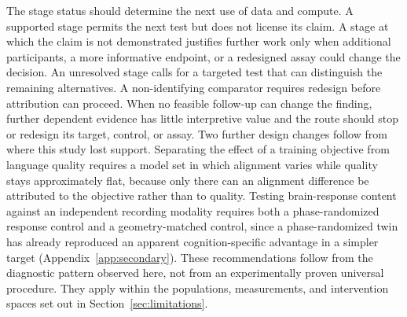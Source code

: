The stage status should determine the next use of data and compute.
A supported stage permits the next test but does not license its claim.
A stage at which the claim is not demonstrated justifies further work only when additional participants, a more informative endpoint, or a redesigned assay could change the decision.
An unresolved stage calls for a targeted test that can distinguish the remaining alternatives.
A non-identifying comparator requires redesign before attribution can proceed.
When no feasible follow-up can change the finding, further dependent evidence has little interpretive value and the route should stop or redesign its target, control, or assay.
Two further design changes follow from where this study lost support.
Separating the effect of a training objective from language quality requires a model set in which alignment varies while quality stays approximately flat, because only there can an alignment difference be attributed to the objective rather than to quality.
Testing brain-response content against an independent recording modality requires both a phase-randomized response control and a geometry-matched control, since a phase-randomized twin has already reproduced an apparent cognition-specific advantage in a simpler target (Appendix~\ref{app:secondary}).
These recommendations follow from the diagnostic pattern observed here, not from an experimentally proven universal procedure.
They apply within the populations, measurements, and intervention spaces set out in Section~\ref{sec:limitations}.
